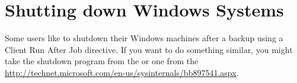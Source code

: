 \section{Shutting down Windows Systems}

Some users like to shutdown their Windows machines after a backup using a
Client Run After Job directive. If you want to do something similar, you might
take the shutdown program from the 
 or one from the 
{\url{http://technet.microsoft.com/en-us/sysinternals/bb897541.aspx}}.
